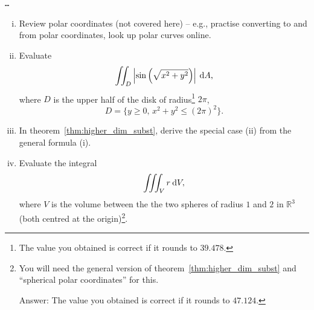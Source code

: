 \begin{application}
\texttt{\ldots}
\end{application}

\begin{exercise}
\begin{enumerate}[(i)]
	\item Review polar coordinates (not covered here) -- e.g., practise converting to and from polar coordinates, look up polar curves online.
	\item Evaluate
	\[ \iint_D \left| \sin\left( \sqrt{x^2+y^2} \right) \right| \: \mathrm{d} A, \]
	where $D$ is the upper half of the disk of radius\footnote{The value you obtained is correct if it rounds to $39.478$.} $2\pi$,
	\[ D = \{ y \geq 0, \, x^2 + y^2 \leq (2\pi)^2 \}. \]
	\item In theorem~\ref{thm:higher_dim_subst}, derive the special case (ii) from the general formula (i).
	\item Evaluate the integral
	\[ \iiint_V r \: \mathrm{d} V, \]
	where $V$ is the volume between the the two spheres of radius $1$ and $2$ in $\mathbb{R}^3$ (both centred at the origin)\footnote{You will need the general version of theorem~\ref{thm:higher_dim_subst} and ``spherical polar coordinates'' for this.
		
	Answer: The value you obtained is correct if it rounds to $47.124$.}.
\end{enumerate}
\end{exercise}
